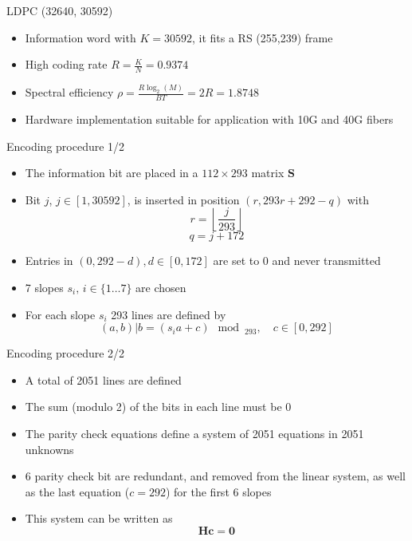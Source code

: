 \documentclass[pdf]
          {beamer}
\begin{document}
\begin{frame}{LDPC (32640, 30592)}
	\begin{itemize}
		\item Information word with $K=30592$, it fits a RS (255,239) frame
		\item High coding rate $R = \frac{K}{N} = 0.9374$
		\item Spectral efficiency $\rho = \frac{R \log_2(M)}{BT} = 2R = 1.8748$
		\item Hardware implementation suitable for application with 10G and 40G fibers
	\end{itemize}
	
\end{frame}

\begin{frame}{Encoding procedure 1/2}
	\begin{itemize}
		\item The information bit are placed in a $112\times 293$ matrix $\mathbf{S}$
		\item Bit $j$, $j\in[1, 30592]$, is inserted in position $(r, 293r + 292 - q)$ with
		\begin{equation*}
			r = \left\lfloor\dfrac{j}{293}\right\rfloor
		\end{equation*}
		\begin{equation*}
			q = j + 172
		\end{equation*}
		\item Entries in $(0, 292-d), d \in [0, 172]$ are set to 0 and never transmitted
		\item 7 slopes $s_i, \, i \in \{1 \dots 7\}$ are chosen
		\item For each slope $s_i$ 293 lines are defined by
		\begin{equation*}
			(a, b) | b = (s_ia + c)\mod_{293}, \quad c \in [0, 292]
		\end{equation*}
	\end{itemize}
\end{frame}

\begin{frame}{Encoding procedure 2/2}
	\begin{itemize}
		\item A total of 2051 lines are defined
		\item The sum (modulo 2) of the bits in each line must be 0
		\item The parity check equations define a system of 2051 equations in 2051 unknowns
		\item 6 parity check bit are redundant, and removed from the linear system, as well as the last equation ($c=292$) for the first 6 slopes
		\item This system can be written as 
		\begin{equation*}
			\mathbf{H} \mathbf{c} = \mathbf{0}
		\end{equation*}
	\end{itemize}
\end{frame}
\end{document}
